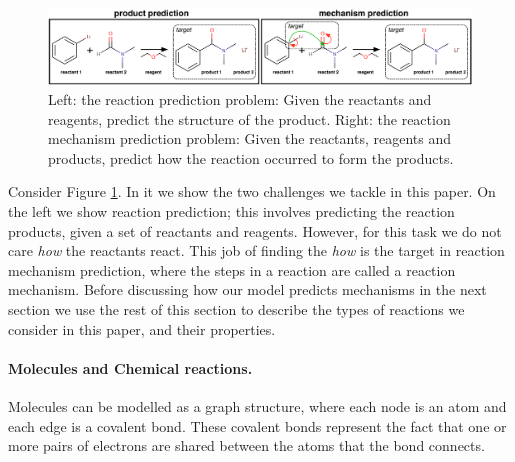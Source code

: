 

\begin{figure}[t!]
\centering
\includegraphics[width=\textwidth]{reaction_diagram}
\caption{Left: the reaction prediction problem: Given the reactants and reagents, predict the structure of the product. Right: the reaction mechanism prediction problem: Given the reactants, reagents and products, predict how the reaction occurred to form the products.}
\label{fig:task-overview}
\end{figure}


Consider Figure \ref{fig:task-overview}. In it we show the two challenges we tackle in this paper. 
On the left we show reaction prediction; this involves predicting the reaction products, given a set of reactants and reagents. However, for this task we do not care {\em how} the reactants react.
 This job of finding the {\em how} is the target in reaction mechanism prediction, where the steps in a reaction are called a reaction mechanism.
 Before discussing how our model predicts mechanisms in the next section we use the rest of this section to describe the types of reactions we consider in this paper, and their properties.


\paragraph{Molecules and Chemical reactions.}


Molecules can be modelled as a graph structure, where each node is an atom and each edge is a covalent bond.
These covalent bonds represent the fact that 
one or more pairs of electrons are shared between the atoms that the bond connects. 


